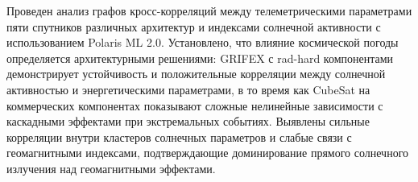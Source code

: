 Проведен анализ графов кросс-корреляций между телеметрическими параметрами пяти спутников различных архитектур и индексами солнечной активности с использованием Polaris ML 2.0. Установлено, что влияние космической погоды определяется архитектурными решениями: GRIFEX с rad-hard компонентами демонстрирует устойчивость и положительные корреляции между солнечной активностью и энергетическими параметрами, в то время как CubeSat на коммерческих компонентах показывают сложные нелинейные зависимости с каскадными эффектами при экстремальных событиях. Выявлены сильные корреляции внутри кластеров солнечных параметров и слабые связи с геомагнитными индексами, подтверждающие доминирование прямого солнечного излучения над геомагнитными эффектами.
